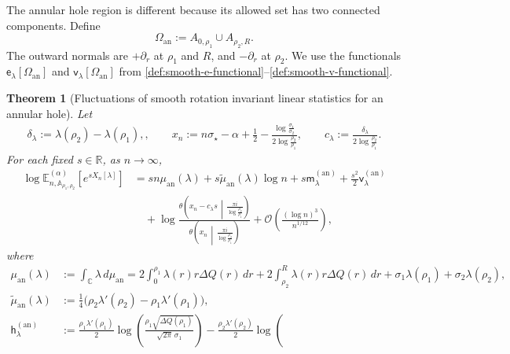 \documentclass[a4paper]{article}
\newtheorem{theorem}{Theorem}[section]
\newcommand{\C}{\mathbb{C}}
\newcommand{\R}{\mathbb{R}}
\numberwithin{equation}{section}
\begin{document}
The annular hole region is different because its allowed set has two connected components.  Define
\begin{equation}
\label{def:allowed-annular-set}
\Omega_{\mathrm{an}}
:=A_{0,\rho_1}\cup A_{\rho_2,R}.
\end{equation}
The outward normals are $+\partial_r$ at $\rho_1$ and $R$, and
$-\partial_r$ at $\rho_2$.  We use the functionals
$\mathsf e_\lambda[\Omega_{\mathrm{an}}]$ and
$\mathsf v_\lambda[\Omega_{\mathrm{an}}]$ from
\eqref{def:smooth-e-functional}--\eqref{def:smooth-v-functional}.

\begin{theorem}[Fluctuations of smooth rotation invariant linear statistics for an annular hole]
\label{theorem:smooth-annular-hole}
Let
\begin{align}
\delta_\lambda:=\lambda(\rho_2)-\lambda(\rho_1),
\label{def:annular-smooth-shortcuts},\qquad
x_n:=n\sigma_\star-\alpha+\frac12-\frac{\log\frac{\sigma_1}{\sigma_2}}{2\log\frac{\rho_2}{\rho_1}},
\qquad c_\lambda:=\frac{\delta_\lambda}{2\log\frac{\rho_2}{\rho_1}}.
\end{align}
For each fixed $s\in\R$, as $n\to\infty$,
\begin{align}
\log \mathbb E_{n,\mathbb A_{\rho_1,\rho_2}}^{(\alpha)}
 \!\left[e^{sX_n[\lambda]}\right]
&=sn\mu_{\mathrm{an}}(\lambda)
+s\widetilde\mu_{\mathrm{an}}(\lambda)\log n
+s\mathsf m_\lambda^{(\mathrm{an})}
+\frac{s^2}{2}\mathsf v_\lambda^{(\mathrm{an})}
\nonumber\\
&\quad
+\log\frac{
 \theta\!\left(x_n-c_\lambda s\,\middle|\,\frac{\pi i}{\log\frac{\rho_2}{\rho_1}}\right)}{
 \theta\!\left(x_n\,\middle|\,\frac{\pi i}{\log\frac{\rho_2}{\rho_1}}\right)}
+\mathcal O\!\left(\frac{(\log n)^3}{n^{1/12}}\right),
\label{eq:smooth-annular-mgf}
\end{align}
where
\begin{align}
\mu_{\mathrm{an}}(\lambda)
&:=\int_{\C}\lambda\,d\mu_{\mathrm{an}}
=2\int_0^{\rho_1}\lambda(r)r\Delta Q(r)\,dr
+2\int_{\rho_2}^{R}\lambda(r)r\Delta Q(r)\,dr
+\sigma_1\lambda(\rho_1)+\sigma_2\lambda(\rho_2),
\label{def:annular-smooth-leading-mean}\\
\widetilde\mu_{\mathrm{an}}(\lambda)
&:=\frac14\bigl(\rho_2\lambda'(\rho_2)
-\rho_1\lambda'(\rho_1)\bigr),
\label{def:annular-smooth-log-mean}\\
\mathsf h_\lambda^{(\mathrm{an})}
&:=\frac{\rho_1\lambda'(\rho_1)}2
 \log\!\left(
 \frac{\rho_1\sqrt{\Delta Q(\rho_1)}}{\sqrt{2\pi}\,\sigma_1}
 \right)
-\frac{\rho_2\lambda'(\rho_2)}2
 \log\!\left(

\end{align}
\end{theorem}
\end{document}
